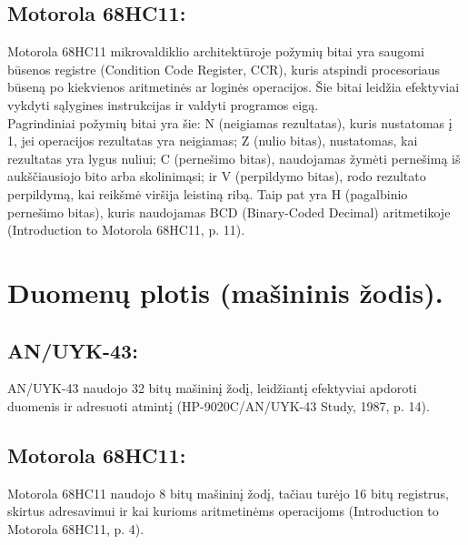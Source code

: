 \documentclass[a4paper,12pt]{article}
\begin{document}
\subsection{Motorola 68HC11:}
Motorola 68HC11 mikrovaldiklio architektūroje požymių bitai yra saugomi būsenos registre (Condition Code Register, CCR), kuris atspindi procesoriaus būseną po kiekvienos aritmetinės ar loginės operacijos. Šie bitai leidžia efektyviai vykdyti sąlygines instrukcijas ir valdyti programos eigą.\\
Pagrindiniai požymių bitai yra šie: N (neigiamas rezultatas), kuris nustatomas į 1, jei operacijos rezultatas yra neigiamas; Z (nulio bitas), nustatomas, kai rezultatas yra lygus nuliui; C (pernešimo bitas), naudojamas žymėti pernešimą iš aukščiausiojo bito arba skolinimąsi; ir V (perpildymo bitas), rodo rezultato perpildymą, kai reikšmė viršija leistiną ribą. Taip pat yra H (pagalbinio pernešimo bitas), kuris naudojamas BCD (Binary-Coded Decimal) aritmetikoje (Introduction to Motorola 68HC11, p. 11).

\section{Duomenų plotis (mašininis žodis).}
\subsection{AN/UYK-43:}
AN/UYK-43 naudojo 32 bitų mašininį žodį, leidžiantį efektyviai apdoroti duomenis ir adresuoti atmintį (HP-9020C/AN/UYK-43 Study, 1987, p. 14).
\subsection{Motorola 68HC11:}
Motorola 68HC11 naudojo 8 bitų mašininį žodį, tačiau turėjo 16 bitų registrus, skirtus adresavimui ir kai kurioms aritmetinėms operacijoms (Introduction to Motorola 68HC11, p. 4).
\end{document}
